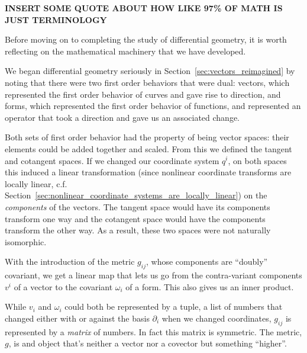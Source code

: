 	
	\textbf{INSERT SOME QUOTE ABOUT HOW LIKE 97\% OF MATH IS JUST TERMINOLOGY}
	
	Before moving on to completing the study of differential geometry, it is worth reflecting on the mathematical machinery that we have developed. 
	
	We began differential geometry seriously in Section~\ref{sec:vectors_reimagined} by noting that there were two first order behaviors that were dual: vectors, which represented the first order behavior of curves and gave rise to direction, and forms, which represented the first order behavior of functions, and represented an operator that took a direction and gave us an associated change.
	
	Both sets of first order behavior had the property of being vector spaces: their elements could be added together and scaled. From this we defined the tangent and cotangent spaces. If we changed our coordinate system $q^i$, on both spaces this induced a linear transformation (since nonlinear coordinate transforms are locally linear, c.f. Section~\ref{sec:nonlinear_coordinate_systems_are_locally_linear}) on the  \emph{components} of the vectors. The tangent space would have its components transform one way and the cotangent space would have the components transform the other way. As a result, these two spaces were not naturally isomorphic.
	
	With the introduction of the metric $g_{ij}$, whose components are ``doubly'' covariant, we get a linear map that lets us go from the contra-variant components $v^i$ of a vector to the covariant $\omega_i$ of a form. This also gives us an inner product. 
	
	While $v_i$ and $\omega_i$ could both be represented by a tuple, a list of numbers that changed either with or against the basis $\partial_i$ when we changed coordinates, $g_{ij}$ is represented by a \emph{matrix} of numbers. In fact this matrix is symmetric. The metric, $g$, is and object that's neither a vector nor a covector but something ``higher''.
	
